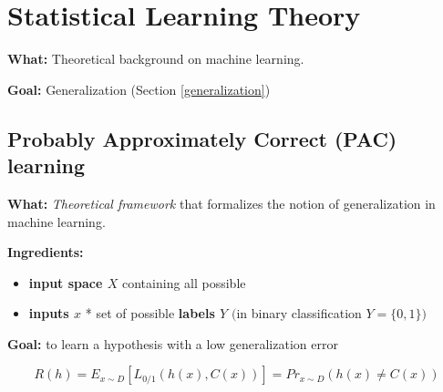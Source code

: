 \documentclass[12pt]{article}
\begin{document}
\section{Statistical Learning Theory
}\label{statistical-learning-theory}

\textbf{What:} Theoretical background on machine learning.

\textbf{Goal:} Generalization (Section \ref{generalization})

\subsection{Probably Approximately Correct (PAC) learning
}\label{probably-approximately-correct-pac-learning}

\textbf{What:} \emph{Theoretical framework} that formalizes the notion
of generalization in machine learning.

\textbf{Ingredients:}

\begin{itemize}
  \item
  \textbf{input space $X$} containing all possible
  \item
  \textbf{inputs $x$} * set of possible \textbf{labels $Y$} $($in binary
  classification $Y = \{0, 1\}$$)$
\end{itemize}

\textbf{Goal:} to learn a hypothesis with a low generalization error

\[R(h) = E_{x \sim D} [L_{0/1}(h(x), C(x))] = Pr_{x \sim D} (h(x) \neq C(x))\]
\end{document}
